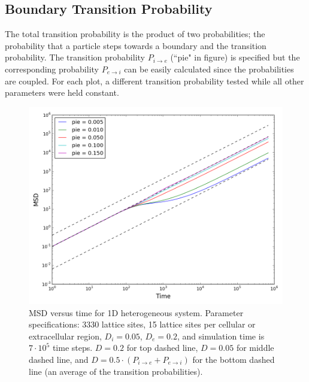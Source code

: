 \subsection{Boundary Transition Probability}
\label{sec:1D-boundary-transition-probability}
	The total transition probability is the product of two probabilities; the probability that a particle steps towards a boundary and the transition probability. The transition probability $ P_{i \rightarrow e} $ (``pie" in figure) is specified but the corresponding probability  $ P_{e \rightarrow i} $ can be easily calculated since the probabilities are coupled. For each plot, a different transition probability tested while all other parameters were held constant.
	
	\begin{figure}[h!]
		\centering
		\includegraphics[width=1.0\linewidth]{../images/1D/pie_msd_1D}
		\caption{MSD versus time for 1D heterogeneous system. Parameter specifications: 3330 lattice sites, 15 lattice sites per cellular or extracellular region, $ D_i = 0.05 $, $ D_e = 0.2 $, and simulation time is $ 7\cdot 10^5 $ time steps. $ D = 0.2 $ for top dashed line, $ D = 0.05 $ for middle dashed line, and $ D = 0.5 \cdot (P_{i \rightarrow e} + P_{e \rightarrow i}) $ for the bottom dashed line (an average of the transition probabilities).}
		\label{fig:pie_msd_1D}
	\end{figure}
	
